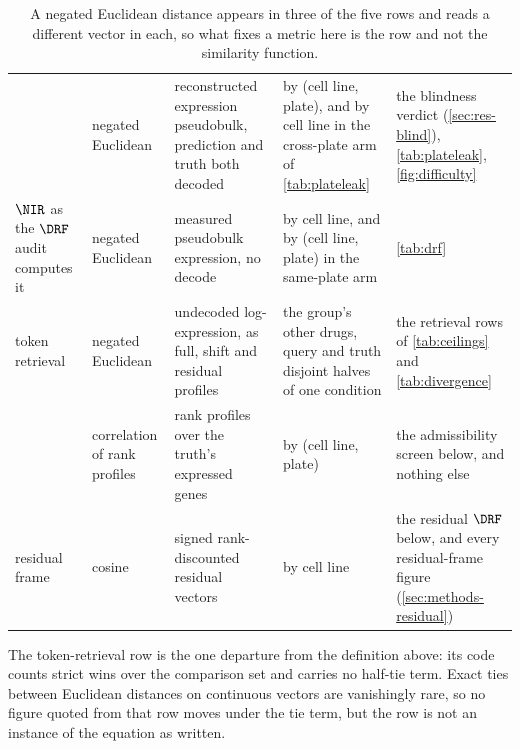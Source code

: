 \begin{table}[htbp]
\caption{ A negated Euclidean distance appears in three of the five rows
and reads a different vector in each, so what fixes a metric here is the row and
not the similarity function.}
\label{tab:sigma}
\begin{fullwidth}
\begin{threeparttable}
\begin{tabularx}{\linewidth}{@{}L{26.5mm} L{28mm} Z{1.05} Z{0.98} >{}Z{0.97}@{}}
 & \thead{$\sigma$} & 
  &  &  \\
\midrule
{} & negated Euclidean & reconstructed expression pseudobulk,
  prediction and truth both decoded & by (cell line, plate), and by cell line in
  the cross-plate arm of \cref{tab:plateleak}
  & the blindness verdict (\cref{sec:res-blind}), \cref{tab:plateleak},
  \cref{fig:difficulty} \\
\addlinespace[10pt]
$\NIR$ as the $\DRF$ audit computes it & negated Euclidean & measured pseudobulk
  expression, no decode & by cell line, and by (cell line, plate) in the
  same-plate arm & \cref{tab:drf} \\
\addlinespace[10pt]
token retrieval & negated Euclidean & undecoded log-expression, as full, shift
  and residual profiles & the group's other drugs, query and truth disjoint
  halves of one condition & the retrieval rows of \cref{tab:ceilings} and
  \cref{tab:divergence} \\
\addlinespace[10pt]
 & correlation of rank profiles & rank profiles over the
  truth's expressed genes & by (cell line, plate) & the admissibility screen
  below, and nothing else \\
\addlinespace[10pt]
residual frame & cosine & signed rank-discounted residual vectors & by cell line
  & the residual $\DRF$ below, and every residual-frame figure
  (\cref{sec:methods-residual}) \\
\end{tabularx}
\begin{tablenotes}[flushleft]
\item The token-retrieval row is the one departure from the definition above:
its code counts strict wins over the comparison set and carries no half-tie
term. Exact ties between Euclidean distances on continuous vectors are
vanishingly rare, so no figure quoted from that row moves under the tie term,
but the row is not an instance of the equation as written.
\end{tablenotes}
\end{threeparttable}
\end{fullwidth}
\end{table}


